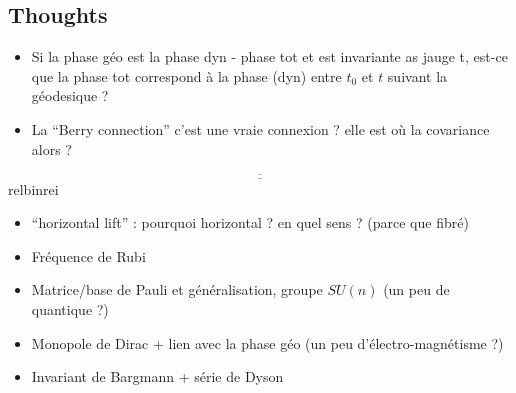 \subsection{Thoughts}

\begin{itemize}
	\item Si la phase géo est la phase dyn - phase tot et est invariante as jauge t, est-ce que la phase tot correspond à la phase (dyn) entre $t_0$ et $t$ suivant la géodesique ?
	
	\item La ``Berry connection'' c'est une vraie connexion ? elle est où la covariance alors ?
\end{itemize}

\[\underline{\overline{\qquad\qquad\qquad\qquad\qquad\qquad\qquad\qquad\qquad\qquad\qquad\qquad\qquad\qquad\qquad\qquad\qquad\qquad}}\]{\color{white}relbinrei}

\begin{itemize}
	\item ``horizontal lift'' : pourquoi horizontal ? en quel sens ? (parce que fibré)
	
	\item Fréquence de Rubi
	
	\item Matrice/base de Pauli et généralisation, groupe $SU(n)$ (un peu de quantique ?)
	
	\item Monopole de Dirac + lien avec la phase géo (un peu d'électro-magnétisme ?)
	
	\item Invariant de Bargmann + série de Dyson
\end{itemize}


\newpage

\listoffigures
\vfill
\lstlistoflistings
\vfill

\newpage

{}

